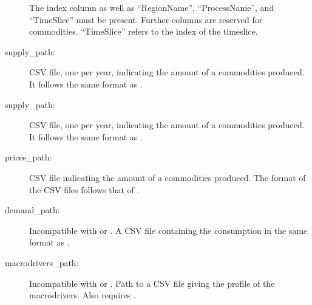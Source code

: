 \documentclass[letterpaper,10pt,english]{sphinxmanual}
\begin{document}
\begin{description}
The index column as well as “RegionName”, “ProcessName”, and “TimeSlice” must be
present. Further columns are reserved for commodities. “TimeSlice” refers to the
index of the timeslice.

\item[{supply\_path:}] \leavevmode
CSV file, one per year, indicating the amount of a commodities produced. It follows
the same format as .

\item[{supply\_path:}] \leavevmode
CSV file, one per year, indicating the amount of a commodities produced. It follows
the same format as .

\item[{prices\_path:}] \leavevmode
CSV file indicating the amount of a commodities produced. The format of the CSV files
follows that of {\hyperref[\detokenize{inputs/projections:inputs-projection}]{}}.

\end{description}
\label{\detokenize{inputs/toml:preset-demand}}\begin{description}
\item[{demand\_path:}] \leavevmode
Incompatible with  or
. A CSV file containing the consumption in the
same format as {\hyperref[\detokenize{inputs/projections:inputs-projection}]{}}.

\end{description}
\label{\detokenize{inputs/toml:preset-macro}}\begin{description}
\item[{macrodrivers\_path:}] \leavevmode
Incompatible with  or
. Path to a CSV file giving the profile of the
macrodrivers. Also requires .

\end{description}
\end{document}
